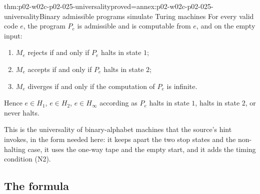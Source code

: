 \begin{hbtheorem}{thm:p02-w02c-p02-025-universality}{proved=annex:p02-w02c-p02-025-universality}{Binary admissible programs simulate Turing machines}
For every valid code \(e\), the program \(P_e\) is admissible and is computable
from \(e\), and on the empty input:
\begin{enumerate}
\item \(M_e\) rejects if and only if \(P_e\) halts in state \(1\);
\item \(M_e\) accepts if and only if \(P_e\) halts in state \(2\);
\item \(M_e\) diverges if and only if the computation of \(P_e\) is infinite.
\end{enumerate}
Hence \(e\in H_1\), \(e\in H_2\), \(e\in H_\infty\) according as \(P_e\) halts
in state \(1\), halts in state \(2\), or never halts.
\end{hbtheorem}

This is the universality of binary-alphabet machines that the source's hint
invokes, in the form needed here: it keeps apart the two stop states and the
non-halting case, it uses the one-way tape and the empty start, and it adds the
timing condition (N2).

\subsection{The formula}
\label{sec:p02-w02c-p02-025-formula}

